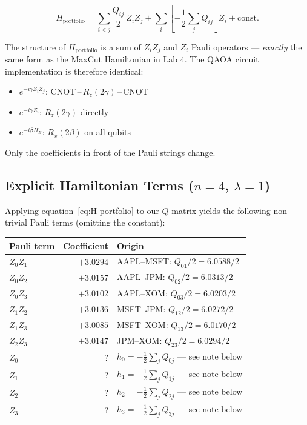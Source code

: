 \documentclass[a4paper,11pt]{article}
\newcommand{\crd}[1]{\textcolor{ibmred}{#1}}
\begin{document}
\begin{equation}
    H_\text{portfolio}
    = \sum_{i<j} \frac{Q_{ij}}{2}\, Z_iZ_j
    + \sum_i \left[-\frac{1}{2}\sum_j Q_{ij}\right] Z_i
    + \text{const.}
    \label{eq:H-portfolio}
\end{equation}

\begin{bridgebox}
The structure of $H_\text{portfolio}$ is a sum of $Z_iZ_j$ and $Z_i$
Pauli operators — \emph{exactly} the same form as the MaxCut Hamiltonian
in Lab 4. The QAOA circuit implementation is therefore identical:
\begin{itemize}
    \item $e^{-i\gamma Z_i Z_j}$: CNOT\,--\,$R_z(2\gamma)$\,--\,CNOT
    \item $e^{-i\gamma Z_i}$: $R_z(2\gamma)$ directly
    \item $e^{-i\beta H_B}$: $R_x(2\beta)$ on all qubits
\end{itemize}
Only the coefficients in front of the Pauli strings change.
\end{bridgebox}

\subsection{Explicit Hamiltonian Terms ($n=4$, $\lambda=1$)}

Applying equation~\eqref{eq:H-portfolio} to our $Q$ matrix yields
the following non-trivial Pauli terms (omitting the constant):

\begin{center}
\begin{tabular}{lrl}
    \toprule
    Pauli term & Coefficient & Origin \\
    \midrule
    $Z_0 Z_1$ & $+3.0294$ & AAPL--MSFT: $Q_{01}/2 = 6.0588/2$ \\
    $Z_0 Z_2$ & $+3.0157$ & AAPL--JPM:  $Q_{02}/2 = 6.0313/2$ \\
    $Z_0 Z_3$ & $+3.0102$ & AAPL--XOM:  $Q_{03}/2 = 6.0203/2$ \\
    $Z_1 Z_2$ & $+3.0136$ & MSFT--JPM:  $Q_{12}/2 = 6.0272/2$ \\
    $Z_1 Z_3$ & $+3.0085$ & MSFT--XOM:  $Q_{13}/2 = 6.0170/2$ \\
    $Z_2 Z_3$ & $+3.0147$ & JPM--XOM:   $Q_{23}/2 = 6.0294/2$ \\
    $Z_0$     & \crd{?} & $h_0 = -\tfrac{1}{2}\sum_j Q_{0j}$ — see note below \\
    $Z_1$     & \crd{?} & $h_1 = -\tfrac{1}{2}\sum_j Q_{1j}$ — see note below \\
    $Z_2$     & \crd{?} & $h_2 = -\tfrac{1}{2}\sum_j Q_{2j}$ — see note below \\
    $Z_3$     & \crd{?} & $h_3 = -\tfrac{1}{2}\sum_j Q_{3j}$ — see note below \\
    \bottomrule
\end{tabular}
\end{center}
\end{document}
